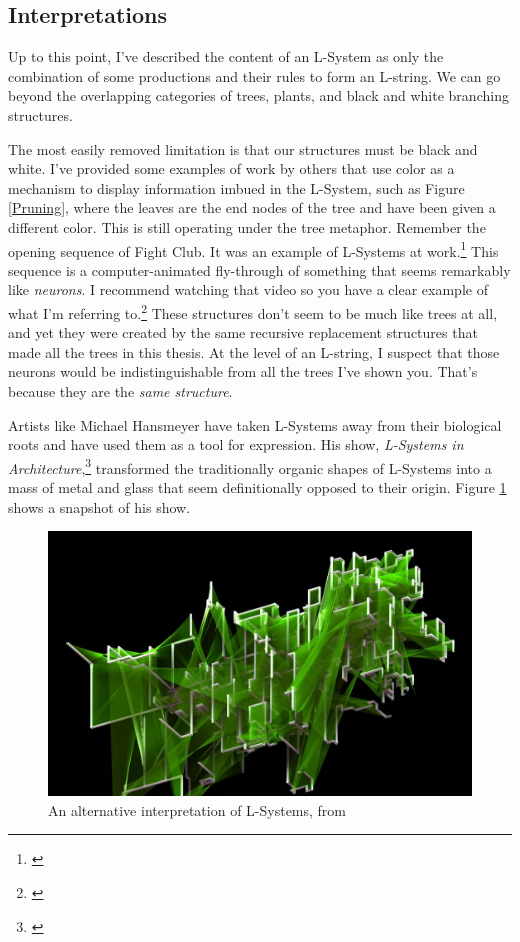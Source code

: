 \documentclass[12pt,twoside]{reedthesis}
\begin{document}
	\subsection{Interpretations}
	\label{Interpretations}
	
	Up to this point, I've described the content of an L-System as only the combination of some productions and their rules to form an L-string. We can go beyond the overlapping categories of trees, plants, and black and white branching structures.
	
	The most easily removed limitation is that our structures must be black and white. I've provided some examples of work by others that use color as a mechanism to display information imbued in the L-System, such as Figure \ref{Pruning}, where the leaves are the end nodes of the tree and have been given a different color. This is still operating under the tree metaphor. Remember the opening sequence of Fight Club. It was an example of L-Systems at work.\footnote{\cite{FightClub1999}} This sequence is a computer-animated fly-through of something that seems remarkably like \textit{neurons}. I recommend watching that video so you have a clear example of what I'm referring to.\footnote{\cite{FightClubVid}} These structures don't seem to be much like trees at all, and yet they were created by the same recursive replacement structures that made all the trees in this thesis. At the level of an L-string, I suspect that those neurons would be indistinguishable from all the trees I've shown you. That's because they are the \textit{same structure}.
	
	Artists like Michael Hansmeyer have taken L-Systems away from their biological roots and have used them as a tool for expression. His show, \textit{L-Systems in Architecture},\footnote{\cite{hansmeyer2003}} transformed the traditionally organic shapes of L-Systems into a mass of metal and glass that seem definitionally opposed to their origin. Figure \ref{Hansmeyer} shows a snapshot of his show.
	
	\begin{figure}[h]
	\centering
	\includegraphics[width=0.8\linewidth]{Images/Hansmeyer}
	\caption{An alternative interpretation of L-Systems, from \cite{hansmeyer2003}}
	\label{Hansmeyer}
	\end{figure}
	
\end{document}
